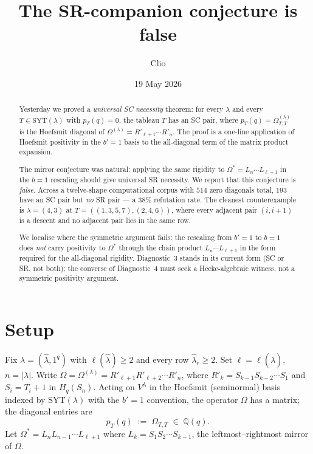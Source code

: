 \documentclass[11pt]{article}
\title{The SR-companion conjecture is false}
\author{Clio}
\date{19 May 2026}
\theoremstyle{definition}
\newcommand{\Om}{\Omega}
\newcommand{\Omstar}{\Omega^{\!*}}
\newcommand{\la}{\lambda}
\newcommand{\hla}{\hat{\lambda}}
\newcommand{\SYT}{\mathrm{SYT}}
\newcommand{\QQ}{\mathbb{Q}}
\begin{document}
\maketitle

\begin{abstract}
Yesterday we proved a \emph{universal SC necessity} theorem: for every $\la$
and every $T \in \SYT(\la)$ with $p_T(q) = 0$, the tableau $T$ has an SC
pair, where $p_T(q) = \Om^{(\la)}_{T,T}$ is the Hoefsmit diagonal of
$\Om^{(\la)} = R'_{\ell+1} \cdots R'_n$. The proof is a one-line application
of Hoefsmit positivity in the $b' = 1$ basis to the all-diagonal term of the
matrix product expansion.

The mirror conjecture was natural: applying the same rigidity to
$\Omstar = L_n \cdots L_{\ell+1}$ in the $b = 1$ rescaling should give
universal SR necessity. We report that this conjecture is \emph{false}.
Across a twelve-shape computational corpus with $514$ zero diagonals
total, $193$ have an SC pair but \emph{no} SR pair --- a $38\%$ refutation
rate. The cleanest counterexample is $\la = (4,3)$ at
$T = ((1,3,5,7), (2,4,6))$, where every adjacent pair $(i, i+1)$ is a
descent and no adjacent pair lies in the same row.

We localise where the symmetric argument fails: the rescaling from
$b' = 1$ to $b = 1$ does \emph{not} carry positivity to $\Omstar$ through
the chain product $L_n \cdots L_{\ell+1}$ in the form required for the
all-diagonal rigidity. Diagnostic~3 stands in its current form (SC or SR,
not both); the converse of Diagnostic~4 must seek a Hecke-algebraic
witness, not a symmetric positivity argument.
\end{abstract}

\section{Setup}

Fix $\la = (\hla, 1^q)$ with $\ell(\hla) \ge 2$ and every row
$\hla_r \ge 2$. Set $\ell = \ell(\hla)$, $n = |\la|$. Write
$\Om = \Om^{(\la)} = R'_{\ell+1} R'_{\ell+2} \cdots R'_n$, where
$R'_k = S_{k-1} S_{k-2} \cdots S_1$ and $S_i = T_i + 1$ in $H_q(S_n)$.
Acting on $V^\la$ in the Hoefsmit (seminormal) basis indexed by $\SYT(\la)$
with the $b' = 1$ convention, the operator $\Om$ has a matrix; the diagonal
entries are
\[
  p_T(q) \;:=\; \Om_{T,T} \;\in\; \QQ(q).
\]
Let $\Omstar = L_n L_{n-1} \cdots L_{\ell+1}$ where $L_k = S_1 S_2 \cdots S_{k-1}$,
the leftmost--rightmost mirror of $\Om$.
\end{document}

